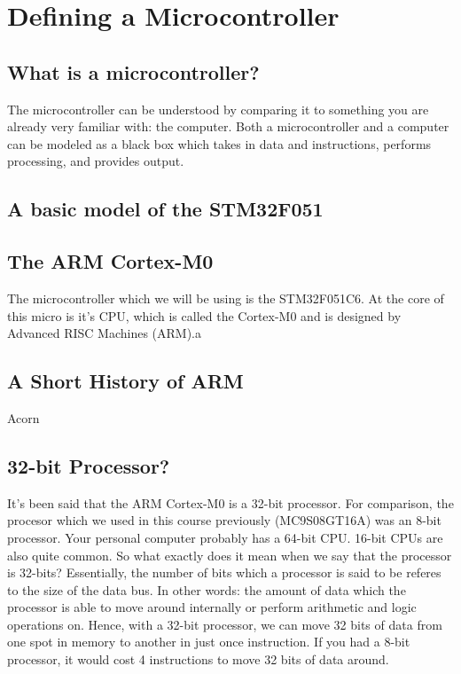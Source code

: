 \section{Defining a Microcontroller}

\subsection{What is a microcontroller?}
The microcontroller can be understood by comparing it to something you are already very familiar with: the computer. Both a microcontroller and a computer can be modeled as a black box which takes in data and instructions, performs processing, and provides output.

\subsection{A basic model of the STM32F051}

\subsection{The ARM Cortex-M0}
The microcontroller which we will be using is the STM32F051C6. At the core of this micro is it's CPU, which is called the Cortex-M0 and is designed by Advanced RISC Machines (ARM).a

\subsection{A Short History of ARM}
Acorn

\subsection{32-bit Processor?}
It's been said that the ARM Cortex-M0 is a 32-bit processor. For comparison, the procesor which we used in this course previously (MC9S08GT16A) was an 8-bit processor. Your personal computer probably has a 64-bit CPU. 16-bit CPUs are also quite common. So what exactly does it mean when we say that the processor is 32-bits? Essentially, the number of bits which a processor is said to be referes to the size of the data bus. In other words: the amount of data which the processor is able to move around internally or perform arithmetic and logic operations on. Hence, with a 32-bit processor, we can move 32 bits of data from one spot in memory to another in just once instruction. If you had a 8-bit processor, it would cost 4 instructions to move 32 bits of data around.  
